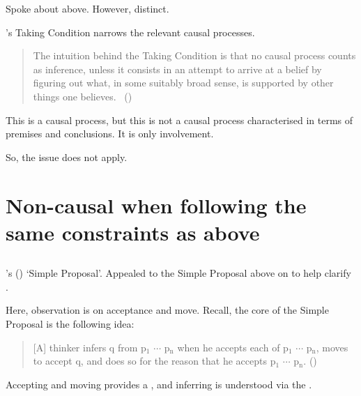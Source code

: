 \begin{note}
  Spoke about \citeauthor{Boghossian:2008vf} above.
  However, distinct.

  \citeauthor{Boghossian:2014aa}'s Taking Condition narrows the relevant causal processes.

  \begin{quote}
    The intuition behind the Taking Condition is that no causal process counts as inference, unless it consists in an attempt to arrive at a belief by figuring out what, in some suitably broad sense, is supported by other things one believes.%
    \mbox{ }\hfill\mbox{(\citeyear[5]{Boghossian:2014aa})}
  \end{quote}

  This is a causal process, but this is not a causal process characterised in terms of premises and conclusions.
  It is only involvement.

  So, the issue does not apply.
\end{note}


\section{Non-causal when following the same constraints as above}
\label{cha:lit:non-causal}


\subsection*{\textcite{Wright:2014tt}}

\begin{note}
  \citeauthor{Wright:2014tt}'s (\citeyear{Wright:2014tt}) `Simple Proposal'.
  Appealed to the Simple Proposal above on  to help clarify \supportI{}.

  Here, observation is on acceptance and move.
  Recall, the core of the Simple Proposal is the following idea:

  \begin{quote}
    [A] thinker infers q from p\(_{1}\) \(\cdots\) p\(_{\text{n}}\) when he accepts each of p\(_{1}\) \(\cdots\) p\(_{\text{n}}\), moves to accept q, and does so for the reason that he accepts p\(_{1}\) \(\cdots\) p\(_{\text{n}}\).%
    \mbox{}\hfill\mbox{(\citeyear[33]{Wright:2014tt})}
  \end{quote}

  Accepting and moving provides a \wit{}, and inferring is understood via the \wit{}.
\end{note}

